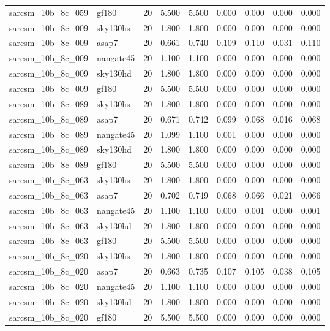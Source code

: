 \begin{tabular}{llrrrrrrr}
sarcsm\_10b\_8c\_059 & gf180 & 20 & 5.500 & 5.500 & 0.000 & 0.000 & 0.000 & 0.000 \\
sarcsm\_10b\_8c\_009 & sky130hs & 20 & 1.800 & 1.800 & 0.000 & 0.000 & 0.000 & 0.000 \\
sarcsm\_10b\_8c\_009 & asap7 & 20 & 0.661 & 0.740 & 0.109 & 0.110 & 0.031 & 0.110 \\
sarcsm\_10b\_8c\_009 & nangate45 & 20 & 1.100 & 1.100 & 0.000 & 0.000 & 0.000 & 0.000 \\
sarcsm\_10b\_8c\_009 & sky130hd & 20 & 1.800 & 1.800 & 0.000 & 0.000 & 0.000 & 0.000 \\
sarcsm\_10b\_8c\_009 & gf180 & 20 & 5.500 & 5.500 & 0.000 & 0.000 & 0.000 & 0.000 \\
sarcsm\_10b\_8c\_089 & sky130hs & 20 & 1.800 & 1.800 & 0.000 & 0.000 & 0.000 & 0.000 \\
sarcsm\_10b\_8c\_089 & asap7 & 20 & 0.671 & 0.742 & 0.099 & 0.068 & 0.016 & 0.068 \\
sarcsm\_10b\_8c\_089 & nangate45 & 20 & 1.099 & 1.100 & 0.001 & 0.000 & 0.000 & 0.000 \\
sarcsm\_10b\_8c\_089 & sky130hd & 20 & 1.800 & 1.800 & 0.000 & 0.000 & 0.000 & 0.000 \\
sarcsm\_10b\_8c\_089 & gf180 & 20 & 5.500 & 5.500 & 0.000 & 0.000 & 0.000 & 0.000 \\
sarcsm\_10b\_8c\_063 & sky130hs & 20 & 1.800 & 1.800 & 0.000 & 0.000 & 0.000 & 0.000 \\
sarcsm\_10b\_8c\_063 & asap7 & 20 & 0.702 & 0.749 & 0.068 & 0.066 & 0.021 & 0.066 \\
sarcsm\_10b\_8c\_063 & nangate45 & 20 & 1.100 & 1.100 & 0.000 & 0.001 & 0.000 & 0.001 \\
sarcsm\_10b\_8c\_063 & sky130hd & 20 & 1.800 & 1.800 & 0.000 & 0.000 & 0.000 & 0.000 \\
sarcsm\_10b\_8c\_063 & gf180 & 20 & 5.500 & 5.500 & 0.000 & 0.000 & 0.000 & 0.000 \\
sarcsm\_10b\_8c\_020 & sky130hs & 20 & 1.800 & 1.800 & 0.000 & 0.000 & 0.000 & 0.000 \\
sarcsm\_10b\_8c\_020 & asap7 & 20 & 0.663 & 0.735 & 0.107 & 0.105 & 0.038 & 0.105 \\
sarcsm\_10b\_8c\_020 & nangate45 & 20 & 1.100 & 1.100 & 0.000 & 0.000 & 0.000 & 0.000 \\
sarcsm\_10b\_8c\_020 & sky130hd & 20 & 1.800 & 1.800 & 0.000 & 0.000 & 0.000 & 0.000 \\
sarcsm\_10b\_8c\_020 & gf180 & 20 & 5.500 & 5.500 & 0.000 & 0.000 & 0.000 & 0.000 \\

\end{tabular}
